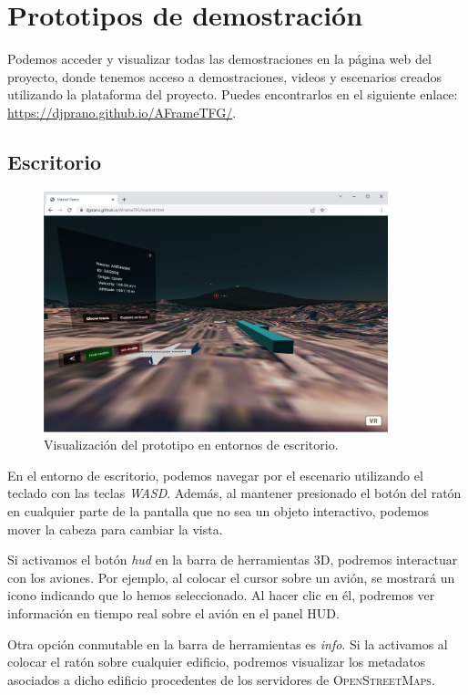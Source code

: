\documentclass[a4paper, 11pt]{book}
\begin{document}
\section{Prototipos de demostración}
Podemos acceder y visualizar todas las demostraciones en la página web del proyecto, donde tenemos acceso a demostraciones, videos y escenarios creados utilizando la plataforma del proyecto. Puedes encontrarlos en el siguiente enlace: \url{https://djprano.github.io/AFrameTFG/}.
\subsection{Escritorio}
\begin{figure}[H]
	\centering
	\includegraphics[width=10cm, keepaspectratio]{img/desktop_demo.png}
	\caption{Visualización del prototipo en entornos de escritorio.}
	\label{fig:desktop_demo}
\end{figure}
En el entorno de escritorio, podemos navegar por el escenario utilizando el teclado con las teclas \emph{WASD}. Además, al mantener presionado el botón del ratón en cualquier parte de la pantalla que no sea un objeto interactivo, podemos mover la cabeza para cambiar la vista.

Si activamos el botón \emph{hud} en la barra de herramientas \textsc{3D}, podremos interactuar con los aviones. Por ejemplo, al colocar el cursor sobre un avión, se mostrará un icono indicando que lo hemos seleccionado. Al hacer clic en él, podremos ver información en tiempo real sobre el avión en el panel \textsc{HUD}.

Otra opción conmutable en la barra de herramientas es \emph{info}. Si la activamos al colocar el ratón sobre cualquier edificio, podremos visualizar los metadatos asociados a dicho edificio procedentes de los servidores de \textsc{OpenStreetMaps}.
\end{document}
